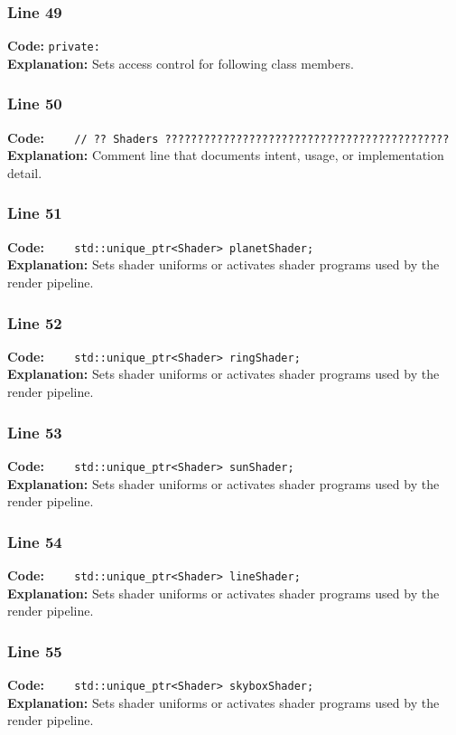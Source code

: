 \documentclass[11pt,a4paper]{article}
\begin{document}
\subsubsection*{Line 49}
\textbf{Code:} \verb|private:|\\
\textbf{Explanation:} Sets access control for following class members.

\subsubsection*{Line 50}
\textbf{Code:} \verb|    // ?? Shaders ????????????????????????????????????????????|\\
\textbf{Explanation:} Comment line that documents intent, usage, or implementation detail.

\subsubsection*{Line 51}
\textbf{Code:} \verb|    std::unique_ptr<Shader> planetShader;|\\
\textbf{Explanation:} Sets shader uniforms or activates shader programs used by the render pipeline.

\subsubsection*{Line 52}
\textbf{Code:} \verb|    std::unique_ptr<Shader> ringShader;|\\
\textbf{Explanation:} Sets shader uniforms or activates shader programs used by the render pipeline.

\subsubsection*{Line 53}
\textbf{Code:} \verb|    std::unique_ptr<Shader> sunShader;|\\
\textbf{Explanation:} Sets shader uniforms or activates shader programs used by the render pipeline.

\subsubsection*{Line 54}
\textbf{Code:} \verb|    std::unique_ptr<Shader> lineShader;|\\
\textbf{Explanation:} Sets shader uniforms or activates shader programs used by the render pipeline.

\subsubsection*{Line 55}
\textbf{Code:} \verb|    std::unique_ptr<Shader> skyboxShader;|\\
\textbf{Explanation:} Sets shader uniforms or activates shader programs used by the render pipeline.
\end{document}
